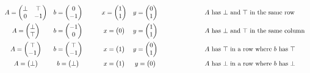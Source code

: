 \documentclass[]{article}
\renewcommand{\.}{\hskip .75pt}
\begin{document}
$$
\begin{array}{cc@{\hspace{30pt}}ccc@{\hspace{60pt}}l}
A =
\begin{pmatrix}
	\bot & \top \\
	0 & -1
\end{pmatrix}
&
b = \begin{pmatrix} 0 \\ -1 \end{pmatrix}
&
x = \begin{pmatrix} 1 \\ 1 \end{pmatrix}
&
y = \begin{pmatrix} 0 \\ 1 \end{pmatrix}
&
&\mbox{ $A$ has $\bot$ and $\top$ in the same row}
%
\vspace{5pt} \\
%
A = \begin{pmatrix} \bot \\ \top \end{pmatrix}
&
b = \begin{pmatrix} -1 \\ 0 \end{pmatrix}
&
x = \begin{pmatrix} 0 \end{pmatrix}
&
y = \begin{pmatrix} 1 \\ 1 \end{pmatrix}
&
&\mbox{ $A$ has $\bot$ and $\top$ in the same column}
%
\vspace{5pt} \\
%
A = \begin{pmatrix} \top \\ -1 \end{pmatrix}
&
b = \begin{pmatrix} \top \\ -1 \end{pmatrix}
&
x = \begin{pmatrix} 1 \end{pmatrix}
&
y = \begin{pmatrix} 0 \\ 1 \end{pmatrix}
&
&\mbox{ $A$ has $\top$ in a row where $b$ has $\top$}
%
\vspace{5pt} \\
%
A = \begin{pmatrix} \bot \end{pmatrix}
&
b = \begin{pmatrix} \bot \end{pmatrix}
&
x = \begin{pmatrix} 1 \end{pmatrix}
&
y = \begin{pmatrix} 0 \end{pmatrix}
&
&\mbox{ $A$ has $\bot$ in a row where $b$ has $\bot$}
\end{array}
$$
\end{document}

